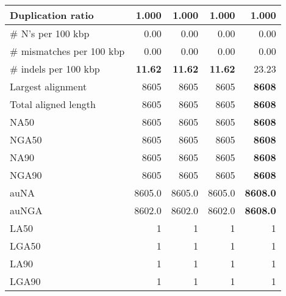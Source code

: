\documentclass[12pt,a4paper]{article}
\begin{document}
\begin{table}[ht]
\begin{center}
\begin{tabular}{|l*{4}{|r}|}
Duplication ratio & 1.000 & 1.000 & 1.000 & 1.000 \\ \hline
\# N's per 100 kbp & 0.00 & 0.00 & 0.00 & 0.00 \\ \hline
\# mismatches per 100 kbp & 0.00 & 0.00 & 0.00 & 0.00 \\ \hline
\# indels per 100 kbp & {\bf 11.62} & {\bf 11.62} & {\bf 11.62} & 23.23 \\ \hline
Largest alignment & 8605 & 8605 & 8605 & {\bf 8608} \\ \hline
Total aligned length & 8605 & 8605 & 8605 & {\bf 8608} \\ \hline
NA50 & 8605 & 8605 & 8605 & {\bf 8608} \\ \hline
NGA50 & 8605 & 8605 & 8605 & {\bf 8608} \\ \hline
NA90 & 8605 & 8605 & 8605 & {\bf 8608} \\ \hline
NGA90 & 8605 & 8605 & 8605 & {\bf 8608} \\ \hline
auNA & 8605.0 & 8605.0 & 8605.0 & {\bf 8608.0} \\ \hline
auNGA & 8602.0 & 8602.0 & 8602.0 & {\bf 8608.0} \\ \hline
LA50 & 1 & 1 & 1 & 1 \\ \hline
LGA50 & 1 & 1 & 1 & 1 \\ \hline
LA90 & 1 & 1 & 1 & 1 \\ \hline
LGA90 & 1 & 1 & 1 & 1 \\ \hline
\end{tabular}
\end{center}
\end{table}
\end{document}
